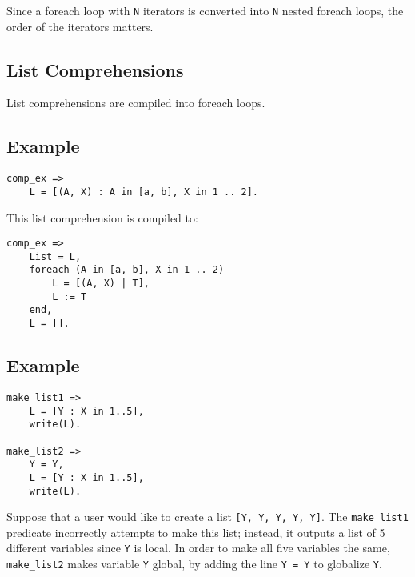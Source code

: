 Since a foreach loop with \texttt{N} iterators is converted into \texttt{N} nested foreach loops, the order of the iterators matters.  

\subsection{List Comprehensions}
List comprehensions are compiled into foreach loops.

\subsection*{Example}
\begin{verbatim}
comp_ex =>
    L = [(A, X) : A in [a, b], X in 1 .. 2].
\end{verbatim}
This list comprehension is compiled to:
\begin{verbatim}
comp_ex =>
    List = L, 
    foreach (A in [a, b], X in 1 .. 2)
        L = [(A, X) | T], 
        L := T
    end,
    L = [].
\end{verbatim}

\subsection*{Example}
\begin{verbatim}
make_list1 =>
    L = [Y : X in 1..5],
    write(L).

make_list2 =>
    Y = Y,
    L = [Y : X in 1..5],
    write(L).
\end{verbatim}
Suppose that a user would like to create a list \texttt{[Y, Y, Y, Y, Y]}.  The \texttt{make\_list1} predicate incorrectly attempts to make this list; instead, it outputs a list of 5 different variables since \texttt{Y} is local.  In order to make all five variables the same, \texttt{make\_list2} makes variable \texttt{Y} global, by adding the line \texttt{Y = Y} to globalize \texttt{Y}.

\ignore{

}

